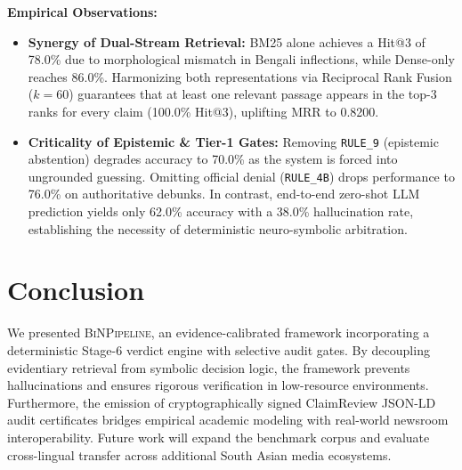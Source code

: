 \documentclass[11pt,a4paper]{article}
\begin{document}
\clearpage

\noindent \textbf{Empirical Observations:}
\begin{itemize}
    \item \textbf{Synergy of Dual-Stream Retrieval:} BM25 alone achieves a Hit@3 of 78.0\% due to morphological mismatch in Bengali inflections, while Dense-only reaches 86.0\%. Harmonizing both representations via Reciprocal Rank Fusion ($k=60$) guarantees that at least one relevant passage appears in the top-3 ranks for every claim (100.0\% Hit@3), uplifting MRR to 0.8200.
    \item \textbf{Criticality of Epistemic \& Tier-1 Gates:} Removing \texttt{RULE\_9} (epistemic abstention) degrades accuracy to 70.0\% as the system is forced into ungrounded guessing. Omitting official denial (\texttt{RULE\_4B}) drops performance to 76.0\% on authoritative debunks. In contrast, end-to-end zero-shot LLM prediction yields only 62.0\% accuracy with a 38.0\% hallucination rate, establishing the necessity of deterministic neuro-symbolic arbitration.
\end{itemize}

\section{Conclusion}
We presented \textsc{BiNPipeline}, an evidence-calibrated framework incorporating a deterministic Stage-6 verdict engine with selective audit gates. By decoupling evidentiary retrieval from symbolic decision logic, the framework prevents hallucinations and ensures rigorous verification in low-resource environments. Furthermore, the emission of cryptographically signed ClaimReview JSON-LD audit certificates bridges empirical academic modeling with real-world newsroom interoperability. Future work will expand the benchmark corpus and evaluate cross-lingual transfer across additional South Asian media ecosystems.

\nocite{*}


\end{document}
